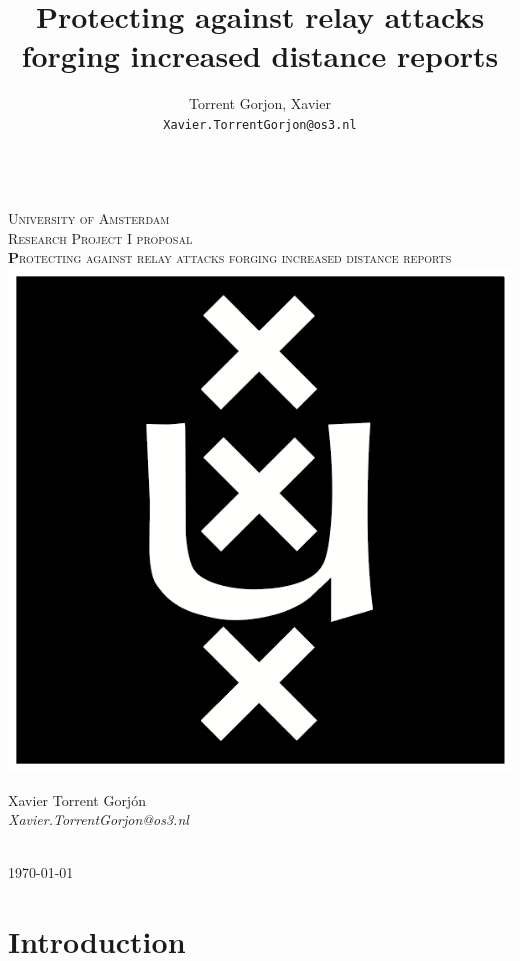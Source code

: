 \documentclass{article}
\author{
  Torrent Gorjon, Xavier\\
  \texttt{Xavier.TorrentGorjon@os3.nl}
}
\title{Protecting against relay attacks forging increased distance reports}
\begin{document}
\begin{titlepage}
\center
\textsc{}\\[1cm]
\textsc{\LARGE University of Amsterdam}\\[1.5cm]

\textsc{\Large Research Project I proposal}\\[0.5cm]

\textsc{\Huge \textbf Protecting against relay attacks forging increased distance reports}\\[1.5cm]

\includegraphics[scale=1]{images/uva.png}\\[1cm]

\begin{minipage}{0.5 \textwidth}
\begin{center} \large
Xavier Torrent Gorj\'{o}n\\
\emph{Xavier.TorrentGorjon@os3.nl}\\[0.5cm]
\end{center}
\end{minipage}\\[2cm]
{\large \today} 


\end{titlepage}


\newpage

\tableofcontents
\section{Introduction}
\end{document}

